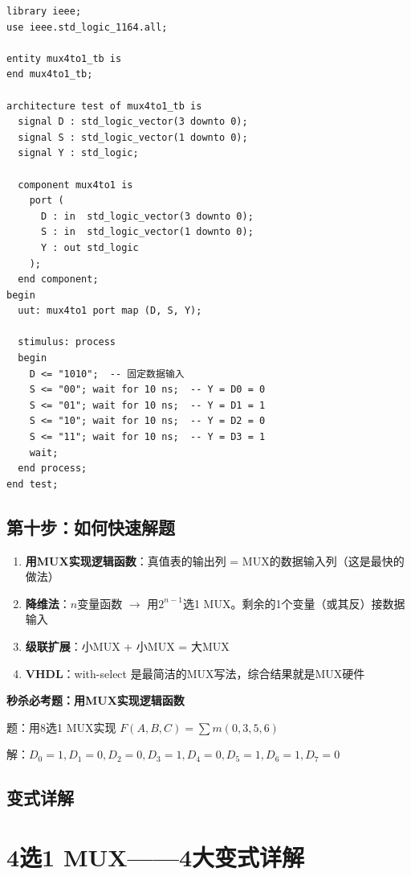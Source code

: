 \begin{lstlisting}[caption={4选1 MUX Testbench}]
library ieee;
use ieee.std_logic_1164.all;

entity mux4to1_tb is
end mux4to1_tb;

architecture test of mux4to1_tb is
  signal D : std_logic_vector(3 downto 0);
  signal S : std_logic_vector(1 downto 0);
  signal Y : std_logic;

  component mux4to1 is
    port (
      D : in  std_logic_vector(3 downto 0);
      S : in  std_logic_vector(1 downto 0);
      Y : out std_logic
    );
  end component;
begin
  uut: mux4to1 port map (D, S, Y);

  stimulus: process
  begin
    D <= "1010";  -- 固定数据输入
    S <= "00"; wait for 10 ns;  -- Y = D0 = 0
    S <= "01"; wait for 10 ns;  -- Y = D1 = 1
    S <= "10"; wait for 10 ns;  -- Y = D2 = 0
    S <= "11"; wait for 10 ns;  -- Y = D3 = 1
    wait;
  end process;
end test;
\end{lstlisting}

\section{第十步：如何快速解题}

\begin{examtip}[MUX快速解题法]
\begin{enumerate}
  \item \textbf{用MUX实现逻辑函数}：真值表的输出列 = MUX的数据输入列（这是最快的做法）
  \item \textbf{降维法}：$n$变量函数 $\to$ 用$2^{n-1}$选1 MUX。剩余的1个变量（或其反）接数据输入
  \item \textbf{级联扩展}：小MUX + 小MUX = 大MUX
  \item \textbf{VHDL}：with-select 是最简洁的MUX写法，综合结果就是MUX硬件
\end{enumerate}
\end{examtip}

\textbf{秒杀必考题：用MUX实现逻辑函数}

\noindent 题：用8选1 MUX实现 $F(A,B,C) = \sum m(0, 3, 5, 6)$

\noindent 解：$D_0=1, D_1=0, D_2=0, D_3=1, D_4=0, D_5=1, D_6=1, D_7=0$

\section{变式详解}
\chapter{4选1 MUX——4大变式详解}


